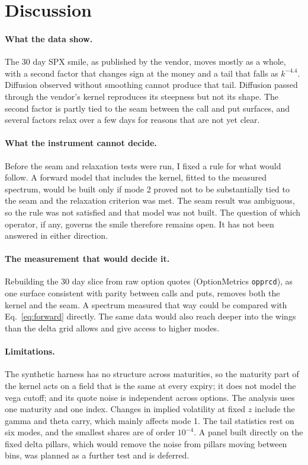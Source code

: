 \documentclass[11pt]{article}
\begin{document}
\section{Discussion}
\label{sec:discussion}

\paragraph{What the data show.} The 30 day SPX smile, as published by the vendor, moves mostly as a whole, with a second factor that changes sign at the money and a tail that falls as $k^{-4.4}$. Diffusion observed without smoothing cannot produce that tail. Diffusion passed through the vendor's kernel reproduces its steepness but not its shape. The second factor is partly tied to the seam between the call and put surfaces, and several factors relax over a few days for reasons that are not yet clear.

\paragraph{What the instrument cannot decide.} Before the seam and relaxation tests were run, I fixed a rule for what would follow. A forward model that includes the kernel, fitted to the measured spectrum, would be built only if mode 2 proved not to be substantially tied to the seam and the relaxation criterion was met. The seam result was ambiguous, so the rule was not satisfied and that model was not built. The question of which operator, if any, governs the smile therefore remains open. It has not been answered in either direction.

\paragraph{The measurement that would decide it.} Rebuilding the 30 day slice from raw option quotes (OptionMetrics \texttt{opprcd}), as one surface consistent with parity between calls and puts, removes both the kernel and the seam. A spectrum measured that way could be compared with Eq.~\eqref{eq:forward} directly. The same data would also reach deeper into the wings than the delta grid allows and give access to higher modes.

\paragraph{Limitations.} The synthetic harness has no structure across maturities, so the maturity part of the kernel acts on a field that is the same at every expiry; it does not model the vega cutoff; and its quote noise is independent across options. The analysis uses one maturity and one index. Changes in implied volatility at fixed $z$ include the gamma and theta carry, which mainly affects mode 1. The tail statistics rest on six modes, and the smallest shares are of order $10^{-4}$. A panel built directly on the fixed delta pillars, which would remove the noise from pillars moving between bins, was planned as a further test and is deferred.
\end{document}
